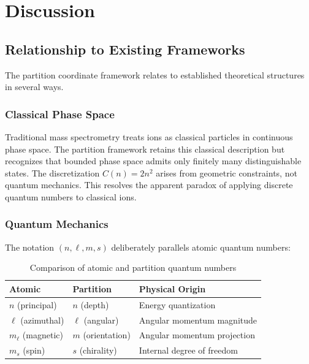 \section{Discussion}
\label{sec:discussion}

\subsection{Relationship to Existing Frameworks}

The partition coordinate framework relates to established theoretical structures in several ways.

\subsubsection{Classical Phase Space}

Traditional mass spectrometry treats ions as classical particles in continuous phase space. The partition framework retains this classical description but recognizes that bounded phase space admits only finitely many distinguishable states. The discretization $C(n) = 2n^2$ arises from geometric constraints, not quantum mechanics. This resolves the apparent paradox of applying discrete quantum numbers to classical ions.

\subsubsection{Quantum Mechanics}

The notation $(n, \ell, m, s)$ deliberately parallels atomic quantum numbers:

\begin{table}[h]
\centering
\caption{Comparison of atomic and partition quantum numbers}
\label{tab:comparison}
\begin{tabular}{lll}
\toprule
\textbf{Atomic} & \textbf{Partition} & \textbf{Physical Origin} \\
\midrule
$n$ (principal) & $n$ (depth) & Energy quantization \\
$\ell$ (azimuthal) & $\ell$ (angular) & Angular momentum magnitude \\
$m_\ell$ (magnetic) & $m$ (orientation) & Angular momentum projection \\
$m_s$ (spin) & $s$ (chirality) & Internal degree of freedom \\
\bottomrule
\end{tabular}
\end{table}

